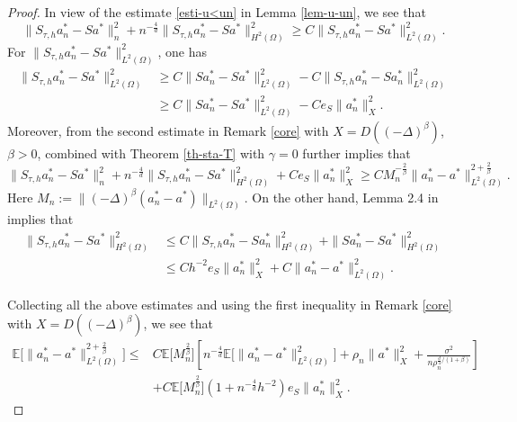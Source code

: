 \documentclass[11pt]{article}
\numberwithin{equation}{section}
\begin{document}
\begin{proof}
In view of the estimate \eqref{esti-u<un} in Lemma \ref{lem-u-un}, we see that
\[ 
 \| S_{\tau,h} a_n^* - S a^* \|^2_n  + n^{-\frac4d}  \| S_{\tau,h} a_n^* - S a^* \|^2_{H^2(\Omega)}  \geq C  \| S_{\tau,h} a_n^* - S a^* \|^2_{L^2(\Omega)}.
\]
For $\| S_{\tau,h} a_n^* - S a^* \|^2_{L^2(\Omega)}$, one has
\begin{align*}
\| S_{\tau,h} a_n^* - S a^* \|^2_{L^2(\Omega)}&\ge C\|Sa_n^* - Sa^*\|^2_{L^2(\Omega)}-C\|S_{\tau,h} a_n^* - S a_n^*\|^2_{L^2(\Omega)}\\
&\ge C\|Sa_n^* - Sa^*\|^2_{L^2(\Omega)}-Ce_S\|a_n^*\|^2_X.
\end{align*}
Moreover, from the second estimate in Remark \ref{core} with $X=D((-\Delta)^{\beta})$, $\beta>0$, combined with Theorem \ref{th-sta-T} with $\gamma=0$ further implies that
\[ 
 \| S_{\tau,h} a_n^* - S a^* \|^2_n  + n^{-\frac4d} \| S_{\tau,h} a_n^* - S a^* \|^2_{H^2(\Omega)}+Ce_S\|a_n^*\|^2_X  \geq C  M_n^{-\frac{2}{\beta}}\| a_n^* - a^* \|^{2+\frac{2}{\beta}}_{L^2(\Omega)} .
\]
Here $M_n:= \|(-\Delta)^\beta (a_n^* - a^*)\|_{L^2(\Omega)}$. On the other hand, Lemma 2.4 in \cite{LiZhang2024} implies that
\begin{align*}
 \| S_{\tau,h} a_n^* - S a^* \|^2_{H^2(\Omega)} &\le C\| S_{\tau,h} a_n^* - S a_n^* \|^2_{H^2(\Omega)}+\| S a_n^* - S a^* \|^2_{H^2(\Omega)} \\
&\leq Ch^{-2}e_S\|a_n^*\|_X^2+C \|a_n^* - a^* \|^2_{L^2(\Omega)}.
\end{align*}

Collecting all the above estimates and using the first inequality in Remark \ref{core} with $X=D((-\Delta)^{\beta})$, we see that
\begin{align*}
\mathbb{E} \bigl[ \| a_n^* - a^* \|^{2+\frac{2}{\beta}}_{L^2(\Omega)} \bigr]
\le &C\mathbb{E} \bigl[M_n^{\frac2\beta} \bigr] \left[n^{-\frac4d}\mathbb{E} \bigl[\|a_n^* - a^* \|^2_{L^2(\Omega)} \bigr] +  \rho_n \| a^* \|^2_{X} +  \frac{\sigma^2}{n \rho_n^{\frac{d}{4}/(1+\beta)}}
\right]\\
&+C\mathbb{E}\bigl[M_n^{\frac2\beta} \bigr]\left(1+n^{-\frac4d}h^{-2}\right)e_S\|a_n^*\|^2_X.
\end{align*}


\end{proof}
\end{document}
